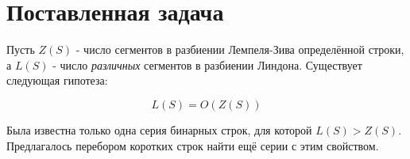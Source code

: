 \section{Поставленная задача}

Пусть $ Z(S) $ - число сегментов в разбиении Лемпеля-Зива определённой строки, а $ L(S) $ - число  \textit{различных} сегментов в разбиении Линдона. Существует следующая гипотеза:

$$ L(S) = O( Z(S) ) $$

Была известна только одна серия бинарных строк, для которой $ L(S) > Z(S) $. Предлагалось перебором коротких строк найти ещё серии с этим свойством.
